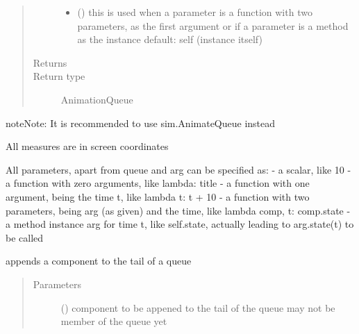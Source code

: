 \documentclass[letterpaper,10pt,english]{sphinxmanual}
\begin{document}
\begin{fulllineitems}
\begin{fulllineitems}
\begin{quote}
\begin{description}
\begin{itemize}
\item {} 
 () \textendash{} this is used when a parameter is a function with two parameters, as the first argument or
if a parameter is a method as the instance 
default: self (instance itself)

\end{itemize}

\item[{Returns}] \leavevmode
{}

\item[{Return type}] \leavevmode
AnimationQueue

\end{description}\end{quote}

\begin{sphinxadmonition}{note}{Note:}
It is recommended to use sim.AnimateQueue instead 

All measures are in screen coordinates 

All parameters, apart from queue and arg can be specified as: 
- a scalar, like 10 
- a function with zero arguments, like lambda: title 
- a function with one argument, being the time t, like lambda t: t + 10 
- a function with two parameters, being arg (as given) and the time, like lambda comp, t: comp.state 
- a method instance arg for time t, like self.state, actually leading to arg.state(t) to be called
\end{sphinxadmonition}

\end{fulllineitems}


\begin{fulllineitems}
\label{\detokenize{Reference:salabim.Queue.append}}
appends a component to the tail of a queue
\begin{quote}\begin{description}
\item[{Parameters}] \leavevmode
{} ({\hyperref[\detokenize{Reference:salabim.Component}]{}}) \textendash{} component to be appened to the tail of the queue 
may not be member of the queue yet

\end{description}\end{quote}


\end{fulllineitems}
\end{fulllineitems}
\end{document}

